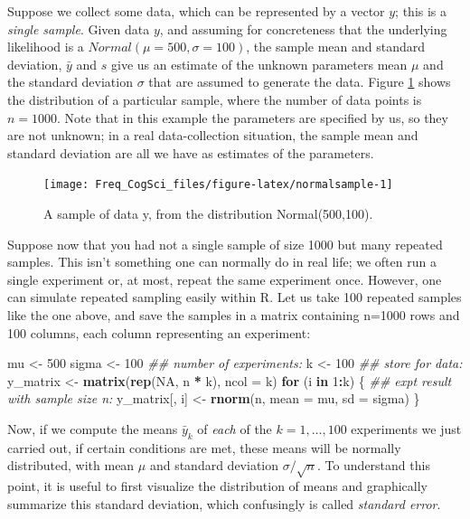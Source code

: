 \documentclass[12pt,]{krantz}
\newenvironment{Shaded}{\begin{snugshade}}{\end{snugshade}}
\newcommand{\CommentTok}[1]{\textcolor[rgb]{0.56,0.35,0.01}{\textit{#1}}}
\newcommand{\ControlFlowTok}[1]{\textcolor[rgb]{0.13,0.29,0.53}{\textbf{#1}}}
\newcommand{\DataTypeTok}[1]{\textcolor[rgb]{0.13,0.29,0.53}{#1}}
\newcommand{\DecValTok}[1]{\textcolor[rgb]{0.00,0.00,0.81}{#1}}
\newcommand{\KeywordTok}[1]{\textcolor[rgb]{0.13,0.29,0.53}{\textbf{#1}}}
\newcommand{\NormalTok}[1]{#1}
\newcommand{\OperatorTok}[1]{\textcolor[rgb]{0.81,0.36,0.00}{\textbf{#1}}}
\newcommand{\OtherTok}[1]{\textcolor[rgb]{0.56,0.35,0.01}{#1}}
\newcommand{\StringTok}[1]{\textcolor[rgb]{0.31,0.60,0.02}{#1}}
\begin{document}
Suppose we collect some data, which can be represented by a vector \(y\); this is a \emph{single sample}. Given data \(y\), and assuming for concreteness that the underlying likelihood is a \(Normal(\mu=500,\sigma=100)\), the sample mean and standard deviation, \(\bar{y}\) and \(s\) give us an estimate of the unknown parameters mean \(\mu\) and the standard deviation \(\sigma\) that are assumed to generate the data. Figure \ref{fig:normalsample} shows the distribution of a particular sample, where the number of data points is \(n=1000\). Note that in this example the parameters are specified by us, so they are not unknown; in a real data-collection situation, the sample mean and standard deviation are all we have as estimates of the parameters.

\begin{figure}
\texttt{[image: Freq\_CogSci\_files/figure-latex/normalsample-1]} \caption{A sample of data y, from the distribution  Normal(500,100).}\label{fig:normalsample}
\end{figure}

Suppose now that you had not a single sample of size 1000 but many repeated samples. This isn't something one can normally do in real life; we often run a single experiment or, at most, repeat the same experiment once. However, one can simulate repeated sampling easily within R. Let us take 100 repeated samples like the one above, and save the samples in a matrix containing n=1000 rows and 100 columns, each column representing an experiment:

\begin{Shaded}
\begin{Highlighting}[]
\NormalTok{mu <-}\StringTok{ }\DecValTok{500}
\NormalTok{sigma <-}\StringTok{ }\DecValTok{100}
\CommentTok{## number of experiments:}
\NormalTok{k <-}\StringTok{ }\DecValTok{100}
\CommentTok{## store for data:}
\NormalTok{y_matrix <-}\StringTok{ }\KeywordTok{matrix}\NormalTok{(}\KeywordTok{rep}\NormalTok{(}\OtherTok{NA}\NormalTok{, n }\OperatorTok{*}\StringTok{ }\NormalTok{k), }\DataTypeTok{ncol =}\NormalTok{ k)}
\ControlFlowTok{for}\NormalTok{ (i }\ControlFlowTok{in} \DecValTok{1}\OperatorTok{:}\NormalTok{k) \{}
  \CommentTok{## expt result with sample size n:}
\NormalTok{  y_matrix[, i] <-}\StringTok{ }\KeywordTok{rnorm}\NormalTok{(n, }\DataTypeTok{mean =}\NormalTok{ mu, }\DataTypeTok{sd =}\NormalTok{ sigma)}
\NormalTok{\}}
\end{Highlighting}
\end{Shaded}

Now, if we compute the means \(\bar{y}_k\) of \emph{each} of the \(k=1,\dots,100\) experiments we just carried out, if certain conditions are met, these means will be normally distributed, with mean \(\mu\) and standard deviation \(\sigma/\sqrt{n}\). To understand this point, it is useful to first visualize the distribution of means and graphically summarize this standard deviation, which confusingly is called \emph{standard error}.
\end{document}

